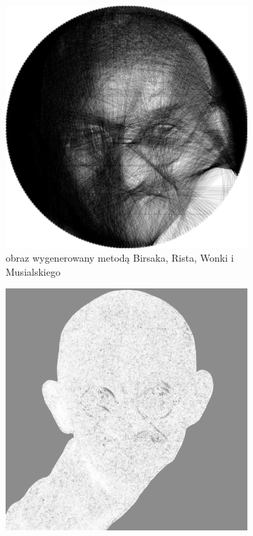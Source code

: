 \begin{figure}[H]
\begin{subfigure}{0.24\textwidth}
        \includegraphics[width = \textwidth]{img/6-comp/gandhi_birsak_.png}
        \caption{obraz wygenerowany metodą Birsaka, Rista, Wonki i Musialskiego}
        \label{comp-comp-gandhi-mandela-b}
    \end{subfigure}
    \begin{subfigure}{0.24\textwidth}
        \centering
        \includegraphics[width = \textwidth]{img/6-comp/gandhi_mask_c20_inv0_bg10_obj1_ed10.png}

\end{subfigure}
\end{figure}
